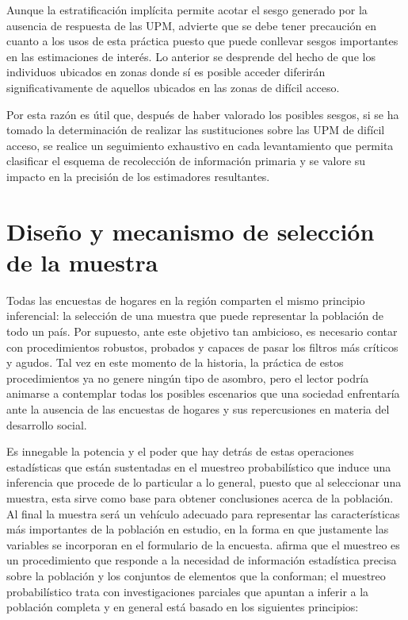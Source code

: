 \documentclass[
  10pt,
  spanish,
]{book}
\begin{document}
Aunque la estratificación implícita permite acotar el sesgo generado por la ausencia de respuesta de las UPM, \citet[págs. 348 - 349]{Vehovar_1999} advierte que se debe tener precaución en cuanto a los usos de esta práctica puesto que puede conllevar sesgos importantes en las estimaciones de interés. Lo anterior se desprende del hecho de que los individuos ubicados en zonas donde sí es posible acceder diferirán significativamente de aquellos ubicados en las zonas de difícil acceso.

Por esta razón es útil que, después de haber valorado los posibles sesgos, si se ha tomado la determinación de realizar las sustituciones sobre las UPM de difícil acceso, se realice un seguimiento exhaustivo en cada levantamiento que permita clasificar el esquema de recolección de información primaria y se valore su impacto en la precisión de los estimadores resultantes.

\hypertarget{diseuxf1o-y-mecanismo-de-selecciuxf3n-de-la-muestra}{%
\chapter{Diseño y mecanismo de selección de la muestra}\label{diseuxf1o-y-mecanismo-de-selecciuxf3n-de-la-muestra}}

Todas las encuestas de hogares en la región comparten el mismo principio inferencial: la selección de una muestra que puede representar la población de todo un país. Por supuesto, ante este objetivo tan ambicioso, es necesario contar con procedimientos robustos, probados y capaces de pasar los filtros más críticos y agudos. Tal vez en este momento de la historia, la práctica de estos procedimientos ya no genere ningún tipo de asombro, pero el lector podría animarse a contemplar todas los posibles escenarios que una sociedad enfrentaría ante la ausencia de las encuestas de hogares y sus repercusiones en materia del desarrollo social.

Es innegable la potencia y el poder que hay detrás de estas operaciones estadísticas que están sustentadas en el muestreo probabilístico que induce una inferencia que procede de lo particular a lo general, puesto que al seleccionar una muestra, esta sirve como base para obtener conclusiones acerca de la población. Al final la muestra será un vehículo adecuado para representar las características más importantes de la población en estudio, en la forma en que justamente las variables se incorporan en el formulario de la encuesta. \citet{Gutierrez_2016} afirma que el muestreo es un procedimiento que responde a la necesidad de información estadística precisa sobre la población y los conjuntos de elementos que la conforman; el muestreo probabilístico trata con investigaciones parciales que apuntan a inferir a la población completa y en general está basado en los siguientes principios:
\end{document}
